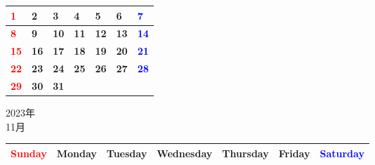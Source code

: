 \documentclass[a4paper,landscape]{jsarticle}
\newcommand{\dig}{\hspace{29mm}}
\newcommand{\tdig}{\hspace{27mm}}
\newcommand{\LBF}{\LARGE\textbf}
\begin{document}
\begingroup
\renewcommand{\arraystretch}{4}
\begin{tabular}{|p{32mm}|p{32mm}|p{32mm}|p{32mm}|p{32mm}|p{32mm}|p{32mm}|}
\hline
\raisebox{30pt} {\dig\textcolor{red}{\LBF{1}}}&\raisebox{30pt} {\dig\LBF{2}}&\raisebox{30pt} {\dig\LBF{3}}&\raisebox{30pt} {\dig\LBF{4}}&\raisebox{30pt} {\dig\LBF{5}}&\raisebox{30pt} {\dig\LBF{6}}&\raisebox{30pt} {\dig\textcolor{blue}{\LBF{7}}}\\
\hline
\raisebox{30pt} {\dig\textcolor{red}{\LBF{8}}}&\raisebox{30pt} {\dig\LBF{9}}&\raisebox{30pt} {\tdig\LBF{10}}&\raisebox{30pt} {\tdig\LBF{11}}&\raisebox{30pt} {\tdig\LBF{12}}&\raisebox{30pt} {\tdig\LBF{13}}&\raisebox{30pt} {\tdig\textcolor{blue}{\LBF{14}}}\\
\hline
\raisebox{30pt} {\tdig\textcolor{red}{\LBF{15}}}&\raisebox{30pt} {\tdig\LBF{16}}&\raisebox{30pt} {\tdig\LBF{17}}&\raisebox{30pt} {\tdig\LBF{18}}&\raisebox{30pt} {\tdig\LBF{19}}&\raisebox{30pt} {\tdig\LBF{20}}&\raisebox{30pt} {\tdig\textcolor{blue}{\LBF{21}}}\\
\hline
\raisebox{30pt} {\tdig\textcolor{red}{\LBF{22}}}&\raisebox{30pt} {\tdig\LBF{23}}&\raisebox{30pt} {\tdig\LBF{24}}&\raisebox{30pt} {\tdig\LBF{25}}&\raisebox{30pt} {\tdig\LBF{26}}&\raisebox{30pt} {\tdig\LBF{27}}&\raisebox{30pt} {\tdig\textcolor{blue}{\LBF{28}}}\\
\hline
\raisebox{30pt} {\tdig\textcolor{red}{\LBF{29}}}&\raisebox{30pt} {\tdig\LBF{30}}&\raisebox{30pt} {\tdig\LBF{31}}&&&&\\
\hline
\end{tabular}
\endgroup

\newpage

\begin{center}
	\LARGE 2023年\\
	\LARGE 11月
\end{center}

\begingroup
\renewcommand{\arraystretch}{1.4}
\begin{tabular}{|>{\centering\arraybackslash}p{32mm}|>{\centering\arraybackslash}p{32mm}|>{\centering\arraybackslash}p{32mm}|>{\centering\arraybackslash}p{32mm}|>{\centering\arraybackslash}p{32mm}|>{\centering\arraybackslash}p{32mm}|>{\centering\arraybackslash}p{32mm}|}
\hline
\textcolor{red}{\large Sunday}&\large Monday&\large Tuesday&\large Wednesday&\large Thursday&\large Friday&\textcolor{blue}{\large Saturday}\\
\hline
\end{tabular}
\endgroup
\end{document}
